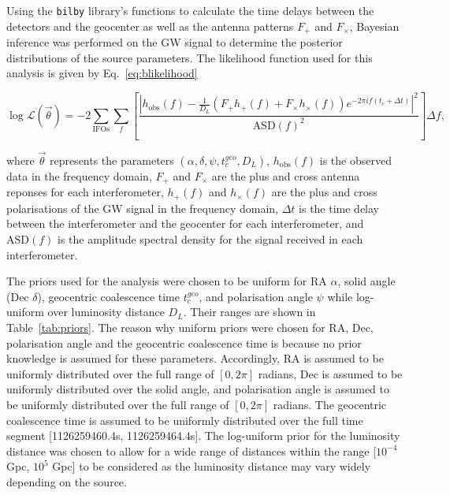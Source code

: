 \documentclass[11pt,a4paper]{article}
\begin{document}
Using the \texttt{bilby} library's functions to calculate the time delays between the detectors and the geocenter as well as the antenna patterns $F_\mathrm{+}$ and $F_\times$, Bayesian inference was performed on the GW signal to determine the posterior distributions of the source parameters. The likelihood function used for this analysis is given by Eq.~\ref{eq:blikelihood}

\begin{equation}
    \log \mathcal{L}(\vec{\theta}) = 
    -2 \sum_{\text{IFOs}} \sum_{f}
    \left[
    \frac{\left| h_{\text{obs}}(f) - \frac{1}{D_L} \left( {F_+} h_+(f) + {F_\times} h_\times(f) \right) e^{-2\pi i f (t_c + \Delta t)} \right|^2}{\text{ASD}(f)^2}
    \right] \Delta f,
    \label{eq:blikelihood}
\end{equation}    

where $\vec{\theta}$ represents the parameters $(\alpha, \delta, \psi, t_c^{geo}, D_L)$, $h_{\text{obs}}(f)$ is the observed data in the frequency domain, $F_+$ and $F_\times$ are the plus and cross antenna reponses for each interferometer, $h_+(f)$ and $h_\times(f)$ are the plus and cross polarisations of the GW signal in the frequency domain, $\Delta t$ is the time delay between the interferometer and the geocenter for each interferometer, and $\text{ASD}(f)$ is the amplitude spectral density for the signal received in each interferometer. 

The priors used for the analysis were chosen to be uniform for RA $\alpha$, solid angle (Dec $\delta$), geocentric coalescence time $t_c^{geo}$, and polarisation angle $\psi$ while log-uniform over luminosity distance $D_L$. Their ranges are shown in Table~\ref{tab:priors}. The reason why uniform priors were chosen for RA, Dec, polarisation angle and the geocentric coalescence time is because no prior knowledge is assumed for these parameters. Accordingly, RA is assumed to be uniformly distributed over the full range of $[0, 2\pi]$ radians, Dec is assumed to be uniformly distributed over the solid angle, and polarisation angle is assumed to be uniformly distributed over the full range of $[0, 2\pi]$ radians. The geocentric coalescence time is assumed to be uniformly distributed over the full time segment [1126259460.4s, 1126259464.4s]. The log-uniform prior for the luminosity distance was chosen to allow for a wide range of distances within the range [$10^{-4}$ Gpc, $10^5$ Gpc] to be considered as the luminosity distance may vary widely depending on the source.
\end{document}
